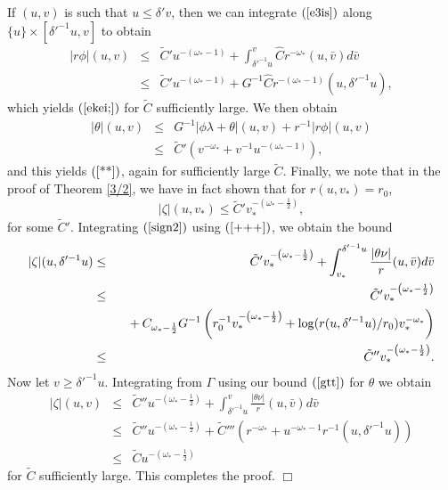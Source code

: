 \documentclass{article}
\begin{document}
If $(u,v)$ is such that $u\le \delta' v$, then we can
integrate $(\ref{e3is})$ along $\{u\}\times[\delta'^{-1}u,v]$ to obtain
\begin{eqnarray}
\nonumber
\label{a*}
|r\phi|(u,v)		&\le& 	\tilde{C}'u^{-(\omega_*-1)}+
						\int_{\delta'^{-1}u}^v
						{\hat{C}r^{-\omega_*}(u,\bar{v})d\bar{v}}\\
			&\le&	\tilde{C}'u^{-(\omega_*-1)}+G^{-1}\hat{C}r^{-(\omega_*-1)}
						(u,\delta'^{-1}u),
\end{eqnarray}
which yields $(\ref{ekei;})$
for $\tilde{C}$ sufficiently large. 
We then obtain
\begin{eqnarray}
\label{gtt}
\nonumber
|\theta|(u,v)	&\le&	G^{-1}|\phi\lambda+\theta|(u,v)+r^{-1}|r\phi|(u,v)\\
		&\le&	\tilde{C}'\left(v^{-\omega_*}+v^{-1}u^{-(\omega_*-1)}\right),
\end{eqnarray}
and this yields $(\ref{**})$,
again for sufficiently large $\tilde{C}$.
Finally, we note that in the proof of Theorem \ref{3/2}, we have in fact 
shown that
for $r(u,v_*)=r_0$, 
\[
|\zeta|(u,v_*)\le\tilde{C}'v_*^{-\left(\omega_*-\frac12\right)},
\]
for some $\tilde{C}'$.
Integrating $(\ref{sign2})$ using $(\ref{+++})$, we obtain the bound
\begin{eqnarray*}
|\zeta|(u,\delta'^{-1}u)	&\le&	\tilde{C}'v_*^{-\left(\omega_*-\frac12\right)}
						+\int_{v_*}^
								{\delta'^{-1}u}
						\frac{|\theta\nu|}r(u,\bar{v})d\bar{v}\\
				&\le&	\tilde{C}'v_*^{-\left(\omega_*-\frac12\right)}\\
				&   &	\hbox{\ \ }
					+C_{\omega_*-\frac12}G^{-1}
								\left(r_0^{-1}
								v_*^{-\left
						(\omega_*-\frac12\right)}+
						\log (r(u,\delta'^{-1}u)/r_0)
							v_*^{-\omega_*}\right)\\
				&\le&	\tilde{C}''v_*^{-\left(\omega_*-\frac12\right)}.
\end{eqnarray*}
Now let $v\ge\delta'^{-1}u$.  Integrating from $\Gamma$ using
our bound $(\ref{gtt})$ for $\theta$ we obtain
\begin{eqnarray*}
|\zeta|(u,v)		&\le&	\tilde{C}''u^{-\left(\omega_*-\frac12\right)}+
						\int_{\delta'^{-1}u}^{v}
						\frac{|\theta\nu|}r(u,\bar{v})d\bar{v}\\
			&\le&	\tilde{C}''u^{-\left(\omega_*-\frac12\right)}+
						\tilde{C}'''\left(
						r^{-\omega_*}+
						u^{-\omega_*-1}r^{-1}(u,\delta'^{-1}u)
						\right)\\
			&\le&	\tilde{C}u^{-\left(\omega_*-\frac12\right)}
\end{eqnarray*}
for $\tilde{C}$ sufficiently large.
This completes the proof.
$\Box$
\end{document}
